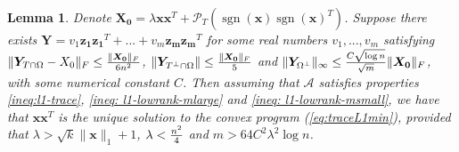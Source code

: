 \documentclass[11pt]{article}
\newtheorem{lemma}[theorem]{Lemma}
\newcommand{\<}{\langle}
\renewcommand{\>}{\rangle}
\newcommand{\vct}[1]{\bm{#1}}
\newcommand{\mtx}[1]{\bm{#1}}
\newcommand{\sgn}{\operatorname{sgn}}
\numberwithin{equation}{section}
\newcommand{\PT}{\mathcal{P}_T}
\newcommand{\cA}{\mathcal{A}}
\begin{document}
\begin{lemma}
\label{exact recovery}
Denote $\mtx{X_0}=\lambda \vct{x}\vct{x}^T+\PT(\sgn(\vct{x})\sgn(\vct{x})^T)$. Suppose there exists $\mtx{Y}=v_1\vct
{z_1}\vct{z_1}^T+...+v_m\vct{z_m}\vct{z_m}^T$ for some real numbers $v_1, ..., v_m$ satisfying
$\|\mtx{Y}_{T\cap \Omega}-X_0\|_F\leq{{\|\mtx{X_0}\|_F}\over{6n^2}}$, $\|\mtx{Y}_{T^\perp \cap \Omega}\|\leq {{\|
\mtx{X_0}\|_F}\over 5}$ and $\|\mtx{Y}_{\Omega^{\perp}}\|_\infty\leq {{C\sqrt{\log n}}\over{\sqrt{m}}}\|
\mtx
{X_0}\|_F$,
with some numerical constant $C$. Then assuming that $\cA$ satisfies properties \eqref {ineq:l1-trace}, \eqref{ineq: l1-lowrank-mlarge} and \eqref{ineq: l1-lowrank-msmall}, we have that $\vct{x}\vct{x}^T$ is the unique solution to the 
convex 
program (\ref{eq:traceL1min}), provided that $\lambda >\sqrt{k}\|\vct{x}\|_1+1$, $\lambda < {{n^2}\over{4}}$ and 
$m>64C^2\lambda^2\log n$.
\end{lemma}
\end{document}
